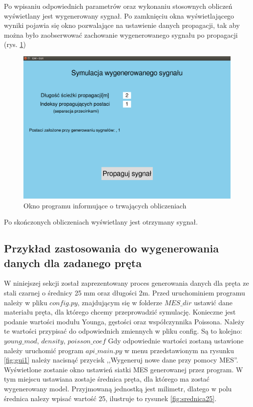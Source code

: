 Po wpisaniu odpowiednich parametrów oraz wykonaniu stosownych obliczeń wyświetlany jest wygenerowany sygnał. Po zamknięciu okna wyświetlającego wyniki pojawia się  okno pozwalające na ustawienie danych propagacji, tak aby można było zaobserwować zachowanie wygenerowanego sygnału po propagacji (rys. \ref{fig:guiLast2})

\begin{figure}[h]
\centering
\includegraphics[width=13cm]{Zdjecia/5/kasia/guiLast2}
\caption{Okno programu informujące o trwających obliczeniach}
\label{fig:guiLast2}
\end{figure}

Po skończonych obliczeniach wyświetlany jest otrzymany sygnał.

\subsection{Przykład zastosowania do wygenerowania danych dla zadanego pręta}

W niniejszej sekcji został zaprezentowany proces generowania danych dla pręta ze stali czarnej o średnicy 25 mm oraz długości 2m. Przed uruchominiem programu należy w pliku $config.py$, znajdującym się w folderze $MES\_dir$ ustawić dane materiału pręta, dla którego chcemy przeprowadzić symulację. Konieczne jest podanie wartości modułu Younga, gęstości oraz współczynnika Poissona. Należy te wartości przypisać do odpowiednich zmiennych w pliku config. Są to kolejno: $young\_mod$, $density$, $poisson\_coef$ Gdy odpowiednie wartości zostaną ustawione należy uruchomić program $api\_main.py$ w menu przedstawionym na rysunku \ref{fig:gui1} należy nacisnąć przycisk ,,Wygeneruj nowe dane przy pomocy MES''. Wyświetlone zostanie okno ustawień siatki MES generowanej przez program. W tym miejscu  ustawiana zostaje średnica pręta, dla którego ma zostać wygenerowany model. Przyjmowaną jednostką jest milimetr, dlatego w polu średnica nalezy wpisać wartość 25, ilustruje to rysunek \ref{fig:srednica25}.

